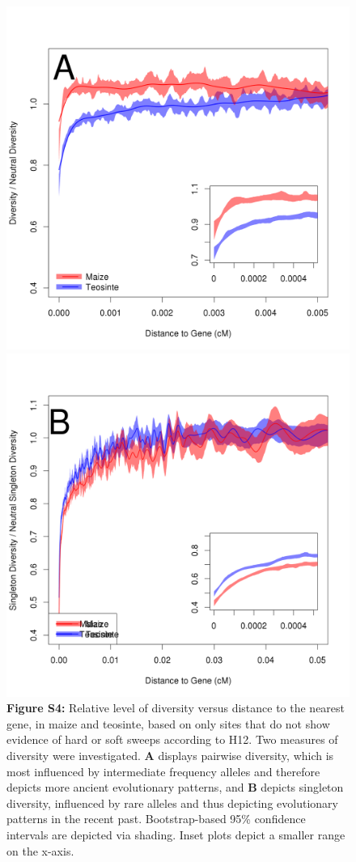 \documentclass{article}
\begin{document}
\begin{figure}[h!]
  \includegraphics[width=.5\textwidth]{FigsAndFiles/distanceToGene_Unselected_manuscript.png}
    \includegraphics[width=.5\textwidth]{FigsAndFiles/distanceToGene_unselected_Singletons_manuscript.png}
{\bf Figure S4:} Relative level of diversity versus distance to the nearest gene, in maize and teosinte, based on only sites that do not show evidence of hard or soft sweeps according to H12. Two measures of diversity were investigated. {\bf A} displays pairwise diversity,
which is most influenced by intermediate frequency alleles and therefore depicts more ancient evolutionary patterns, and {\bf B} depicts singleton diversity, influenced by rare alleles
and thus depicting evolutionary patterns in the recent past. Bootstrap-based 95\% confidence intervals are depicted via shading. Inset plots depict a smaller range on the x-axis.
\end{figure}
\end{document}
